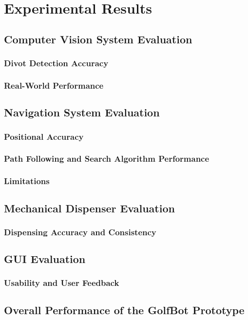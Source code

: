 \chapter{Experimental Results}
\label{chap:validation}

\section{Computer Vision System Evaluation}
\subsection{Divot Detection Accuracy}
\subsection{Real-World Performance}

\section{Navigation System Evaluation}
\subsection{Positional Accuracy}
\subsection{Path Following and Search Algorithm Performance}
\subsection{Limitations}

\section{Mechanical Dispenser Evaluation}
\subsection{Dispensing Accuracy and Consistency}

\section{GUI Evaluation}
\subsection{Usability and User Feedback}

\section{Overall Performance of the GolfBot Prototype}
